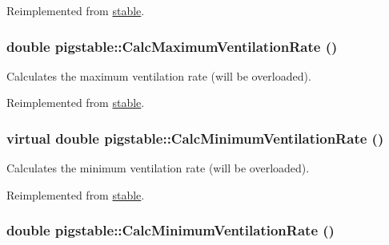 Reimplemented from \hyperlink{classstable_a40ccfa66db782fe4bb8fdcb19ef20f00}{stable}.\hypertarget{classpigstable_a8b3e2aff62122c23b6b6e95829731b80}{
\subsubsection[{CalcMaximumVentilationRate}]{\setlength{\rightskip}{0pt plus 5cm}double pigstable::CalcMaximumVentilationRate ()}}
\label{classpigstable_a8b3e2aff62122c23b6b6e95829731b80}


Calculates the maximum ventilation rate (will be overloaded). 

Reimplemented from \hyperlink{classstable_a40ccfa66db782fe4bb8fdcb19ef20f00}{stable}.\hypertarget{classpigstable_a9dc314d78207fccac503793e8fa4885d}{
\subsubsection[{CalcMinimumVentilationRate}]{\setlength{\rightskip}{0pt plus 5cm}virtual double pigstable::CalcMinimumVentilationRate ()}}
\label{classpigstable_a9dc314d78207fccac503793e8fa4885d}


Calculates the minimum ventilation rate (will be overloaded). 

Reimplemented from \hyperlink{classstable_a9bd7855c10c562f9ea785d6ba3608dcc}{stable}.\hypertarget{classpigstable_ae93e1ef050422ae6e4e156b888a56330}{
\subsubsection[{CalcMinimumVentilationRate}]{\setlength{\rightskip}{0pt plus 5cm}double pigstable::CalcMinimumVentilationRate ()}}
\label{classpigstable_ae93e1ef050422ae6e4e156b888a56330}


